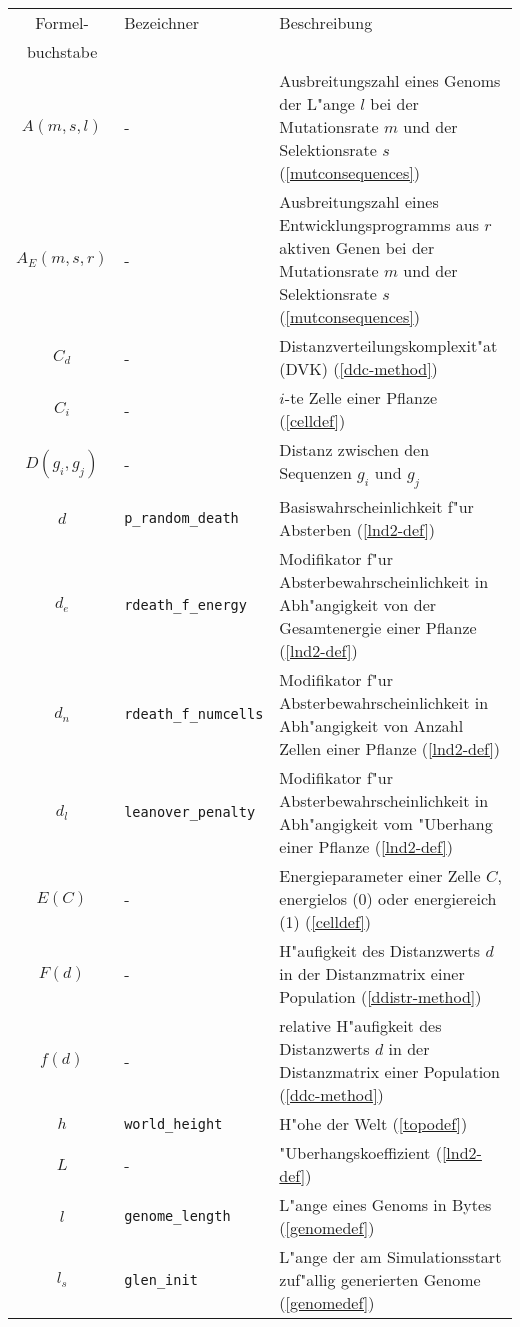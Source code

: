 \begin{appendix}
\noindent\begin{tabularx}{\linewidth}{|c|l|X|} \hline
Formel-      & Bezeichner               & Beschreibung \\
buchstabe    &                          & \\ \hline
$A(m, s, l)$ & -                        & Ausbreitungszahl eines Genoms der L"ange $l$ bei der Mutationsrate $m$
                                          und der Selektionsrate $s$ (\ref{mutconsequences}) \\
$A_E(m, s, r)$ & -                      & Ausbreitungszahl eines Entwicklungsprogramms aus $r$ aktiven Genen bei der Mutationsrate $m$
                                          und der Selektionsrate $s$ (\ref{mutconsequences}) \\
$C_d$        & -                        & Distanzverteilungskomplexit"at (DVK) (\ref{ddc-method}) \\
$C_i$        & -                        & $i$-te Zelle einer Pflanze (\ref{celldef}) \\
$D(g_i,g_j)$ & -                        & Distanz zwischen den Sequenzen $g_i$ und $g_j$ \\
$d$          & \verb|p_random_death|    & Basiswahrscheinlichkeit f"ur Absterben (\ref{lnd2-def}) \\
$d_e$        & \verb|rdeath_f_energy|   & Modifikator f"ur Absterbewahrscheinlichkeit in Abh"angigkeit
                                          von der Gesamtenergie einer Pflanze (\ref{lnd2-def}) \\
$d_n$        & \verb|rdeath_f_numcells| & Modifikator f"ur Absterbewahrscheinlichkeit in Abh"angigkeit von Anzahl Zellen 
					  einer Pflanze (\ref{lnd2-def}) \\
$d_l$        & \verb|leanover_penalty|  & Modifikator f"ur Absterbewahrscheinlichkeit in Abh"angigkeit vom "Uberhang 
					  einer Pflanze (\ref{lnd2-def}) \\
$E(C)$       & -                        & Energieparameter einer Zelle $C$, energielos (0) oder energiereich (1)
					  (\ref{celldef}) \\
$F(d)$       & -                        & H"aufigkeit des Distanzwerts $d$ in der Distanzmatrix einer
					  Population (\ref{ddistr-method})\\
$f(d)$       & -                        & relative H"aufigkeit des Distanzwerts $d$ in der Distanzmatrix
					  einer Population (\ref{ddc-method}) \\
$h$          & \verb|world_height|      & H"ohe der Welt (\ref{topodef}) \\
$L$          & -                        & "Uberhangskoeffizient (\ref{lnd2-def}) \\
$l$          & \verb|genome_length|     & L"ange eines Genoms in Bytes (\ref{genomedef}) \\
$l_s$        & \verb|glen_init|         & L"ange der am Simulationsstart zuf"allig generierten Genome (\ref{genomedef}) \\ \hline
\end{tabularx}


\end{appendix}
